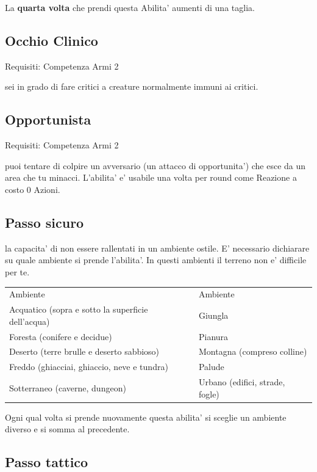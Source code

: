 \documentclass[a4paper,11pt,twoside,openany]{dndbook}
\begin{document}
La \textbf{quarta volta} che prendi questa Abilita' aumenti di una taglia.

\subsection{Occhio Clinico}

Requisiti: Competenza Armi 2

sei in grado di fare critici a creature normalmente immuni ai critici.

\subsection{Opportunista}

Requisiti: Competenza Armi 2

puoi tentare di colpire un avversario (un attacco di opportunita') che esce da un area che tu minacci. L'abilita' e' usabile una volta per round come Reazione a costo 0 Azioni.

\subsection{Passo sicuro}

la capacita' di non essere rallentati in un ambiente ostile. E' necessario dichiarare su quale ambiente si prende l'abilita'. In questi ambienti il terreno non e' difficile per te.

\bigskip

\begin{tabular}[c]{@{}ll@{}}
\toprule 
Ambiente & Ambiente\tabularnewline
Acquatico (sopra e sotto la superficie dell'acqua) & Giungla\tabularnewline
Foresta (conifere e decidue) & Pianura\tabularnewline
Deserto (terre brulle e deserto sabbioso) & Montagna (compreso colline)\tabularnewline
Freddo (ghiacciai, ghiaccio, neve e tundra) & Palude\tabularnewline
Sotterraneo (caverne, dungeon) & Urbano (edifici, strade, fogle)\tabularnewline
\bottomrule
\end{tabular}

\bigskip

Ogni qual volta si prende nuovamente questa abilita' si sceglie un
ambiente diverso e si somma al precedente.

\subsection{Passo tattico}
\end{document}
